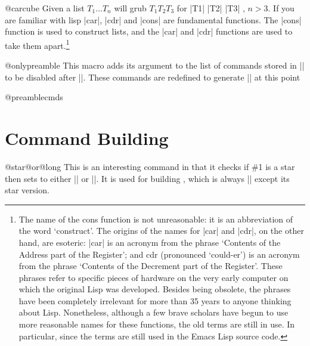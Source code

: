 \begin{docCommand}{@carcube}{}
Given a list $T_1\dots T_n$ \cmd{\@carcube} will grub $T_1 T_2 T_3$ for |T1| |T2| |T3| , $n > 3$. If you are familiar with
lisp |car|, |cdr| and |cons| are fundamental functions. The |cons|  function is used to construct lists, and the |car|
 and |cdr| functions are used to take them apart.\footnote{The name of the cons function is not unreasonable: it is an abbreviation of the word `construct'. The origins of the names for |car| and |cdr|, on the other hand, are esoteric: |car| is an acronym from 
 the phrase `Contents of the Address part of the Register'; and cdr (pronounced `could-er') is an acronym from the phrase 
 `Contents of the Decrement part of the Register'. These phrases refer to specific pieces of hardware on 
 the very early computer on which the original Lisp was developed. Besides being obsolete, the phrases have been completely irrelevant for more than 35 years to anyone thinking about Lisp. Nonetheless, although a few brave scholars have begun to 
 use more reasonable names for these functions, the old terms are still in use. In particular, since the terms 
 are still used in the Emacs Lisp source code.}
\end{docCommand}



\begin{docCommand}{@onlypreamble}{}
    This macro adds its argument to the list of commands stored in
    |\@preamblecmds| to be
    disabled after ||. These commands are redefined
    to generate |\@notprerr| at this point
\end{docCommand}

\begin{docCommand}{@preamblecmds}{}
\end{docCommand}
\begin{teX}
\def\@preamblecmds{}
\def\@onlypreamble#1{%
  \expandafter\gdef\expandafter\@preamblecmds\expandafter{%
       \@preamblecmds\do#1}}
       
\@onlypreamble\@onlypreamble
\@onlypreamble\@preamblecmds
\end{teX}


\section{Command Building}

\begin{docCommand}{@star@or@long} {  }
This is an interesting command in that it checks if \#1 is a star then sets  to either |\long| or |\relax|. It is used for building , which is always |\long| except its star version.
\end{docCommand}

